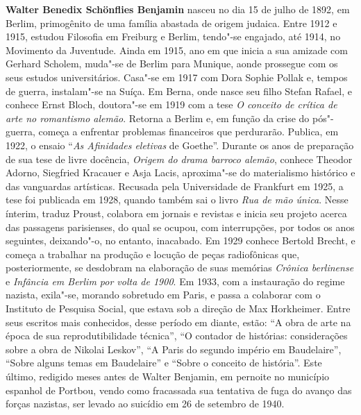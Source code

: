 
\textbf{Walter Benedix Schönflies Benjamin} nasceu no dia 15 de julho de 1892, em Berlim,
primogênito de uma família abastada de origem judaica. Entre 1912 e 1915, estudou Filosofia
em Freiburg e Berlim, tendo"-se engajado, até 1914, no Movimento da Juventude. Ainda em
1915, ano em que inicia a sua amizade com Gerhard Scholem, muda"-se de Berlim para
Munique, aonde prossegue com os seus estudos universitários. Casa"-se em 1917 com Dora
Sophie Pollak e, tempos de guerra, instalam"-se na Suíça. Em Berna, onde nasce seu filho Stefan
Rafael, e conhece Ernst Bloch, doutora"-se em 1919 com a tese \emph{O conceito de crítica de
arte no romantismo alemão}. Retorna a Berlim e, em função da crise do pós"-guerra, começa a
enfrentar problemas financeiros que perdurarão. Publica, em 1922, o ensaio ``\emph{As Afinidades
eletivas} de Goethe''. Durante os anos de preparação de sua tese de livre docência, \emph{Origem do
drama barroco alemão}, conhece Theodor Adorno, Siegfried Kracauer e Asja Lacis, aproxima"-se do materialismo histórico e das vanguardas artísticas. Recusada pela Universidade de
Frankfurt em 1925, a tese foi publicada em 1928, quando também sai o livro \emph{Rua de mão única}.
Nesse ínterim, traduz Proust, colabora em jornais e revistas e inicia seu projeto acerca das
passagens parisienses, do qual se ocupou, com interrupções, por todos os anos seguintes,
deixando"-o, no entanto, inacabado. Em 1929 conhece Bertold Brecht, e começa a trabalhar na
produção e locução de peças radiofônicas que, posteriormente, se desdobram na elaboração de
suas memórias \emph{Crônica berlinense} e \emph{Infância em Berlim por volta de 1900}. Em 1933, com a
instauração do regime nazista, exila"-se, morando sobretudo em Paris, e passa a colaborar com o
Instituto de Pesquisa Social, que estava sob a direção de Max Horkheimer. Entre seus escritos
mais conhecidos, desse período em diante, estão: ``A obra de arte na época de sua
reprodutibilidade técnica'', ``O contador de histórias: considerações sobre a obra de Nikolai
Leskov'', ``A Paris do segundo império em Baudelaire'', ``Sobre alguns temas em Baudelaire'' e
``Sobre o conceito de história''. Este último, redigido meses antes de Walter Benjamin, em
pernoite no município espanhol de Portbou, vendo como fracassada sua tentativa de fuga do
avanço das forças nazistas, ser levado ao suicídio em 26 de setembro de 1940.



